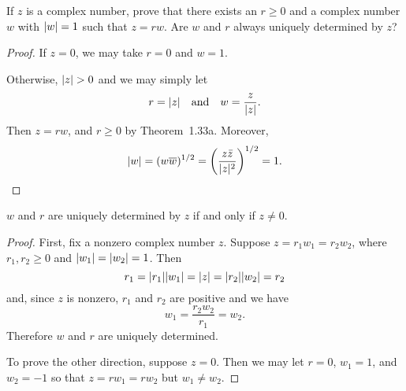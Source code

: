  If $z$ is a complex number, prove that there exists an
$r\geq0$ and a complex number $w$ with $\lvert{w}\rvert = 1$ such that
$z = rw$. Are $w$ and $r$ always uniquely determined by $z$?
\begin{proof}
  If $z = 0$, we may take $r = 0$ and $w = 1$.

  Otherwise, $\lvert{z}\rvert > 0$ and we may simply let
  \begin{equation*}
    r = \lvert{z}\rvert \quad\text{and}\quad w = \frac{z}{\lvert{z}\rvert}.
  \end{equation*}
  Then $z = rw$, and $r\geq0$ by Theorem~1.33a. Moreover,
  \begin{equation*}
    \lvert{w}\rvert = (w\overline{w})^{1/2}
    = \left(\frac{z\bar{z}}{\lvert{z}\rvert^2}\right)^{1/2}
    = 1. \qedhere
  \end{equation*}
\end{proof}
\begin{claim}
  $w$ and $r$ are uniquely determined by $z$ if and only if $z\neq0$.
\end{claim}
\begin{proof}
  First, fix a nonzero complex number $z$. Suppose
  $z = r_1w_1 = r_2w_2$, where $r_1,r_2\geq0$ and
  $\lvert{w_1}\rvert = \lvert{w_2}\rvert = 1$. Then
  \begin{equation*}
    r_1 = \lvert{r_1}\rvert\lvert{w_1}\rvert = \lvert{z}\rvert = \lvert{r_2}\rvert\lvert{w_2}\rvert = r_2
  \end{equation*}
  and, since $z$ is nonzero, $r_1$ and $r_2$ are positive and we have
  \begin{equation*}
    w_1 = \frac{r_2w_2}{r_1} = w_2.
  \end{equation*}
  Therefore $w$ and $r$ are uniquely determined.

  To prove the other direction, suppose $z = 0$. Then we may let
  $r = 0$, $w_1 = 1$, and $w_2 = -1$ so that $z = rw_1 = rw_2$ but
  $w_1\neq w_2$.
\end{proof}
